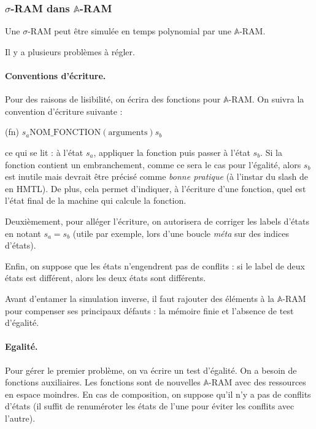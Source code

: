 \documentclass{article}
\newcommand{\bbA}{\mathbb{A}}
\begin{document}
			\subsubsection{$\sigma$-RAM dans $\bbA$-RAM}
			
			\begin{lemma}
				Une $\sigma$-RAM peut être simulée en temps polynomial par une $\bbA$-RAM.
			\end{lemma}

			\begin{demo}
				Il y a plusieurs problèmes à régler. 
		
				\paragraph{Conventions d'écriture.}
				Pour des raisons de lisibilité, on écrira des fonctions pour $\bbA$-RAM. On suivra la convention d'écriture suivante : 
				
				(fn) 	$s_a \text{NOM\_FONCTION} (\text{arguments})s_b$
				
				ce qui se lit : à l'état $s_a$, appliquer la fonction puis passer à l'état $s_b$. Si la fonction contient un embranchement, comme ce sera le cas pour l'égalité, alors $s_b$ est inutile mais devrait être précisé comme \emph{bonne pratique} (à l'instar du slash de  en HMTL). De plus, cela permet d'indiquer, à l'écriture d'une fonction, quel est l'état final de la machine qui calcule la fonction.
				
				Deuxièmement, pour alléger l'écriture, on autorisera de corriger les labels d'états en notant $s_a = s_b$ (utile par exemple, lors d'une boucle \emph{méta} sur des indices d'états).
								
				Enfin, on suppose que les états n'engendrent pas de conflits : si le label de deux états est différent, alors les deux états sont différents.
				
				Avant d'entamer la simulation inverse, il faut rajouter des éléments à la $\bbA$-RAM pour compenser ses principaux défauts : la mémoire finie et l'absence de test d'égalité. 

				
				\paragraph{Egalité.}
				Pour gérer le premier problème, on va écrire un test d'égalité. On a besoin de fonctions auxiliaires. Les fonctions sont de nouvelles $\bbA$-RAM avec des ressources en espace moindres. En cas de composition, on suppose qu'il n'y a pas de conflits d'états (il suffit de renuméroter les états de l'une pour éviter les conflits avec l'autre).


\end{demo}
\end{document}
